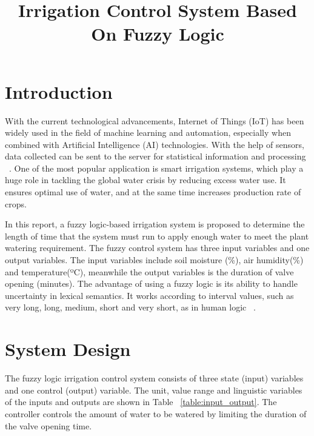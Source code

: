 \documentclass[conference]{IEEEtran}
\begin{document}
\title{
   Irrigation Control System Based On Fuzzy Logic
}

\author{
}
\maketitle



\section{Introduction}
With the current technological advancements, Internet of Things (IoT) has been widely used in the field of machine learning and automation, especially when combined with Artificial Intelligence (AI) technologies. With the help of sensors, data collected can be sent to the server for statistical information and processing ~\cite{kokkonis_kontogiannis_tomtsis_2017}. One of the most popular application is smart irrigation systems, which play a huge role in tackling the global water crisis by reducing excess water use. It ensures optimal use of water, and at the same time increases production rate of crops. 

In this report, a fuzzy logic-based irrigation system is proposed to determine the length of time that the system must run to apply enough water to meet the plant watering requirement. The fuzzy control system has three input variables and one output variables. The input variables include soil moisture (\%), air humidity(\%) and temperature(ºC), meanwhile the output variables is the duration of valve opening (minutes). The advantage of using a fuzzy logic is its ability to handle uncertainty in lexical semantics. It works according to interval values, such as very long, long, medium, short and very short, as in human logic ~\cite{alpay_erdem_2018}.

\section{System Design}
The fuzzy logic irrigation control system consists of three state (input) variables and one control (output) variable. The unit, value range and linguistic variables of the inputs and outputs are shown in Table ~\ref{table:input_output}. The controller controls the amount of water to be watered by limiting the duration of the valve opening time. 
\end{document}
